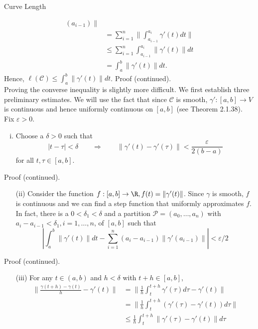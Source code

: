 \documentclass[smaller,hyperref={CJKbookmarks=true}]{beamer}
\begin{document}
\begin{frame}{Curve Length}
\begin{spacing}{1.05}
\begin{equation*}
\begin{split}
     (a_{i-1})\|\\
       &=\sum_{i=1}^{n}\Big\|\int_{a_{i-1}}^{a_i}
       \gamma'(t)dt\Big\|  \\
       &\leq\sum_{i=1}^{n}\int_{a_{i-1}}^{a_i}\|\gamma'(t)
       \|dt  \\
       &=\int_{a}^{b}\|\gamma'(t)\|dt.
  \end{split}
\end{equation*}
Hence, $\ell(\mathcal{C})\leq\int_{a}^{b}\|\gamma'(t)\|dt$.
\newpage
\alert{Proof (continued).}\\
Proving the converse inequality is slightly more dif{}ficult. We first establish
three preliminary estimates. We will use the fact that since $\mathcal{C}$ is smooth, $\gamma':[a,b]\to V$ is continuous and hence uniformly continuous on $[a,b]$ (see Theorem 2.1.38). Fix $\varepsilon>0$.
\begin{enumerate}[(i)]
  \item Choose a $\delta>0$ such that
      \[|t-\tau|<\delta\qquad\Rightarrow\qquad
      \|\gamma'(t)-\gamma'(\tau)\|<\frac{\varepsilon}{2(b-a)}\]
      for all $t,\tau\in[a,b]$.
\end{enumerate}
\newpage
\alert{Proof (continued).}
\begin{itemize}
  \item[(ii)] Consider the function $f:[a,b]\to\R,f(t)=\|\gamma'(t)\|$. Since $\gamma$ is smooth, $f$ is continuous and we can find a step function that uniformly approximates $f$. In fact, there is a $0<\delta_1<\delta$ and a partition $\mathcal{P}=(a_0,\ldots,a_n)$ with $a_i-a_{i-1}<\delta_1,i=1,\ldots,n$, of $[a,b]$ such that
      \[\left|\int_{a}^{b}\|\gamma'(t)\|dt-\sum_{i=1}^{n}
      (a_i-a_{i-1})\|\gamma'(a_{i-1})\|\right|<\varepsilon/2\]
\end{itemize}
\newpage
\alert{Proof (continued).}\\
\begin{itemize}
  \item[(iii)] For any $t\in(a,b)$ and $h<\delta$ with $t+h\in[a,b]$,
  \begin{equation*}
    \begin{split}
       \Big\|\frac{\gamma(t+h)-\gamma(t)}{h}-\gamma'(t)\Big\| &=\Big\|\frac{1}{h}\int_{t}^{t+h}\gamma'(\tau)d\tau-\gamma'(t)\Big\| \\
         &=\Big\|\frac{1}{h}\int_{t}^{t+h}\left(\gamma'(\tau)-\gamma'(t)\right)d\tau\Big\|  \\
         &\leq\frac{1}{h}\int_{t}^{t+h}\|\gamma'(\tau)-\gamma'(t)\|d\tau  \\

\end{split}
\end{equation*}
\end{itemize}
\end{spacing}
\end{frame}
\end{document}
